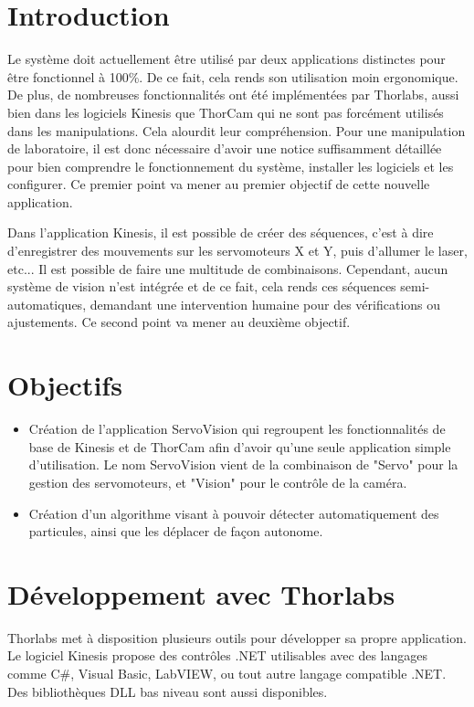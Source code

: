 \section{Introduction}

Le système doit actuellement être utilisé par deux applications distinctes pour être fonctionnel à 100\%. De ce fait, cela rends son utilisation moin ergonomique. De plus, de nombreuses fonctionnalités ont été implémentées par Thorlabs, aussi bien dans les logiciels Kinesis que ThorCam qui ne sont pas forcément utilisés dans les manipulations. Cela alourdit leur compréhension. Pour une manipulation de laboratoire, il est donc nécessaire d'avoir une notice suffisamment détaillée pour bien comprendre le fonctionnement du système, installer les logiciels et les configurer. Ce premier point va mener au premier objectif de cette nouvelle application.

Dans l'application Kinesis, il est possible de créer des séquences, c'est à dire d'enregistrer des mouvements sur les servomoteurs X et Y, puis d'allumer le laser, etc... Il est possible de faire une multitude de combinaisons. Cependant, aucun système de vision n'est intégrée et de ce fait, cela rends ces séquences semi-automatiques, demandant une intervention humaine pour des vérifications ou ajustements. Ce second point va mener au deuxième objectif.

\section{Objectifs}
\begin{itemize}[label=\textbullet]
    \item Création de l'application ServoVision qui regroupent les fonctionnalités de base de Kinesis et de ThorCam afin d'avoir qu'une seule application simple d'utilisation. Le nom ServoVision vient de la combinaison de "Servo" pour la gestion des servomoteurs, et "Vision" pour le contrôle de la caméra.
    \item Création d'un algorithme visant à pouvoir détecter automatiquement des particules, ainsi que les déplacer de façon autonome.
\end{itemize}

\newpage
\section{Développement avec Thorlabs}
Thorlabs met à disposition plusieurs outils pour développer sa propre application. Le logiciel Kinesis propose des contrôles .NET utilisables avec des langages comme C\#, Visual Basic, LabVIEW, ou tout autre langage compatible .NET. Des bibliothèques DLL bas niveau sont aussi disponibles.

